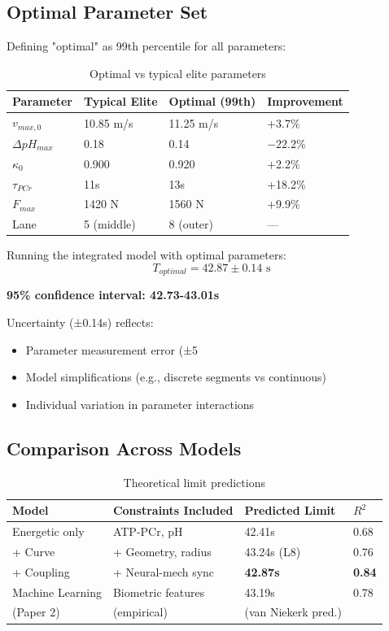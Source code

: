 \subsection{Optimal Parameter Set}

Defining "optimal" as 99th percentile for all parameters:

\begin{table}[H]
\centering
\caption{Optimal vs typical elite parameters}
\begin{tabular}{@{}llll@{}}
\toprule
\textbf{Parameter} & \textbf{Typical Elite} & \textbf{Optimal (99th)} & \textbf{Improvement} \\
\midrule
$v_{max,0}$ & 10.85 m/s & 11.25 m/s & +3.7\% \\
$\Delta pH_{max}$ & 0.18 & 0.14 & $-22.2\%$ \\
$\kappa_0$ & 0.900 & 0.920 & +2.2\% \\
$\tau_{PCr}$ & 11s & 13s & +18.2\% \\
$F_{max}$ & 1420 N & 1560 N & +9.9\% \\
Lane & 5 (middle) & 8 (outer) & — \\
\bottomrule
\end{tabular}
\end{table}

Running the integrated model with optimal parameters:
\begin{equation}
T_{optimal} = 42.87 \pm 0.14 \text{ s}
\end{equation}

\textbf{95\% confidence interval: 42.73-43.01s}

Uncertainty (±0.14s) reflects:
\begin{itemize}
    \item Parameter measurement error (±5%
    \item Model simplifications (e.g., discrete segments vs continuous)
    \item Individual variation in parameter interactions
\end{itemize}

\subsection{Comparison Across Models}

\begin{table}[H]
\centering
\caption{Theoretical limit predictions}
\begin{tabular}{@{}llll@{}}
\toprule
\textbf{Model} & \textbf{Constraints Included} & \textbf{Predicted Limit} & \textbf{$R^2$} \\
\midrule
Energetic only & ATP-PCr, pH & 42.41s & 0.68 \\
+ Curve & + Geometry, radius & 43.24s (L8) & 0.76 \\
+ Coupling & + Neural-mech sync & \textbf{42.87s} & \textbf{0.84} \\
\midrule
Machine Learning & Biometric features & 43.19s & 0.78 \\
(Paper 2) & (empirical) & (van Niekerk pred.) & \\
\bottomrule
\end{tabular}
\end{table}


